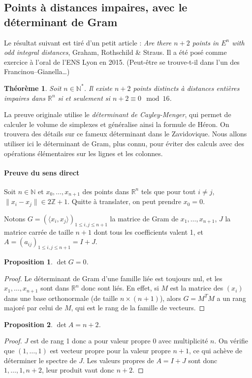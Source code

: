 \documentclass[a4paper, 11pt]{article}
\def\Z{\mathbb{Z}}
\def\N{\mathbb{N}}
\def\R{\mathbb{R}}
\newtheorem*{proposition}{Proposition}
\newtheorem*{theorem}{Théorème}
\begin{document}
\subsection{Points à distances impaires, avec le déterminant de Gram}

Le résultat suivant est tiré d'un petit article : \emph{Are there $n+2$ points
  in $E^n$ with odd integral distances}, Graham, Rothschild \& Straus. Il a été
posé comme exercice à l'oral de l'ENS Lyon en 2015. (Peut-être se trouve-t-il
dans l'un des Francinou--Gianella…)
\begin{theorem}
  Soit $n \in \N^*$. Il existe $n+2$ points distincts à distances entières
  impaires dans $\R^n$ si et seulement si $n+2 \equiv 0 \mod 16$.
\end{theorem}

La preuve originale utilise le \emph{déterminant de Cayley-Menger}, qui permet
de calculer le volume de simplexes et généralise ainsi la formule de Héron. On
trouvera des détails sur ce fameux déterminant dans le Zavidovique. Nous allons
utiliser ici le déterminant de Gram, plus connu, pour éviter des calculs avec
des opérations élémentaires sur les lignes et les colonnes.

\paragraph{Preuve du sens direct}

Soit $n \in \N$ et $x_0, \ldots, x_{n+1}$ des points dans $\R^n$ tels que pour
tout $i \neq j$, $\|x_i - x_j\| \in 2\Z + 1$. Quitte à translater, on peut
prendre $x_0 = 0$.

Notons $G = (\langle x_i, x_j \rangle)_{1 \leq i,j \leq n+1}$ la matrice de Gram
de $x_1, \ldots, x_{n+1}$, $J$ la matrice carrée de taille $n+1$ dont tous les
coefficients valent 1, et $A = (a_{ij})_{1 \leq i,j \leq n+1} = I+J$.

\begin{proposition}
  $\det G = 0$.
\end{proposition}
\begin{proof}
  Le déterminant de Gram d'une famille liée est toujours nul, et les $x_1,
  \ldots, x_{n+1}$ sont dans $\R^n$ donc sont liés. En effet, si $M$ est la
  matrice des $(x_i)$ dans une base orthonormale (de taille $n \times (n+1)$),
  alors $G = M^T M$ a un rang majoré par celui de $M$, qui est le rang de la
  famille de vecteurs.
\end{proof}

\begin{proposition}
  $\det A = n+2$.
\end{proposition}
\begin{proof}
  $J$ est de rang 1 donc a pour valeur propre 0 avec multiplicité $n$. On
  vérifie que $(1,\ldots,1)$ est vecteur propre pour la valeur propre $n+1$, ce
  qui achève de déterminer le spectre de $J$. Les valeurs propres de $A = I+J$
  sont donc $1, \ldots, 1, n+2$, leur produit vaut donc $n+2$.
\end{proof}
\end{document}
